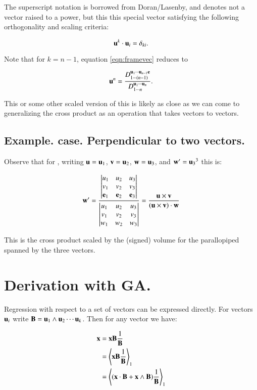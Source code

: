 \documentclass{article}      %
\newcommand{\gpgradeone}[1] {{\left\langle{{#1}}\right\rangle}_{1}}
\begin{document}
The superscript notation is borrowed from Doran/Lasenby, and denotes not a vector raised to a power, but this
this special vector satisfying the following orthogonality and scaling criteria:

\begin{equation}\label{eqn:reciportho}
\mathbf{u}^k \cdot \mathbf{u}_i = \delta_{ki}.
\end{equation}

Note that for $k=n-1$, equation \ref{eqn:framevec} reduces to

\begin{equation} \label{eqn:framevecnminus}
\mathbf{u}^n =
\frac{ D_{1 \cdots (n-1)}^{\mathbf{u}_1 \cdots \mathbf{u}_{n-1} \mathbf{e}} } { D_{1 \cdots n}^{\mathbf{u}_1 \cdots \mathbf{u}_n} }.
\end{equation}

This or some other scaled version of this is likely as close as we can come to generalizing the cross product
as an operation that takes vectors to vectors.

\subsection{ Example.   case.  Perpendicular to two vectors. }

Observe that for , writing $\mathbf{u} = \mathbf{u}_1$, $\mathbf{v} = \mathbf{u}_2$, $\mathbf{w} = \mathbf{u}_3$, and $\mathbf{w}' = {\mathbf{u}_3}^3$ this is:

\begin{equation}
\mathbf{w}' = 
\frac{\begin{vmatrix} {u}_{1} & {u}_{2} & {u}_{3} \\ {v}_{1} & {v}_{2} & {v}_{3} \\ {\mathbf{e}}_{1} & {\mathbf{e}}_{2} & {\mathbf{e}}_{3} \end{vmatrix}}{\begin{vmatrix} {u}_{1} & {u}_{2} & {u}_{3} \\ {v}_{1} & {v}_{2} & {v}_{3} \\ {w}_{1} & {w}_{2} & {w}_{3} \end{vmatrix}}
= 
\frac{\mathbf{u} \times \mathbf{v}}{(\mathbf{u} \times \mathbf{v}) \cdot \mathbf{w}}
\end{equation}

This is the cross product scaled by the (signed) volume for the parallopiped spanned by the three vectors.

\section{ Derivation with GA. }

Regression with respect to a set of vectors can be expressed directly.  For vectors ${\mathbf{u}_i}$ write $\mathbf{B} = \mathbf{u}_1 \wedge \mathbf{u}_2 \cdots \mathbf{u}_k$.  Then for any vector we have:

\begin{align*}
\Bx 
&= \Bx \BB \inv{\BB}  \\
&= \gpgradeone{ \Bx \BB \inv{\BB} } \\
&= \gpgradeone{ (\Bx \cdot \BB + \Bx \wedge \BB) \inv{\BB} }
\end{align*}
\end{document}
